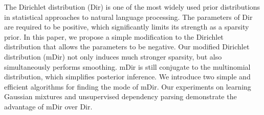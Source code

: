 The Dirichlet distribution (Dir) is one of the most widely used prior distributions in statistical approaches to natural language processing. The parameters of Dir are required to be positive, which significantly limits its strength as a sparsity prior. In this paper, we propose a simple modification to the Dirichlet distribution that allows the parameters to be negative. Our modified Dirichlet distribution (mDir) not only induces much stronger sparsity, but also simultaneously performs smoothing. mDir is still conjugate to the multinomial distribution, which simplifies posterior inference. We introduce two simple and efficient algorithms for finding the mode of mDir. Our experiments on learning Gaussian mixtures and unsupervised dependency parsing demonstrate the advantage of mDir over Dir.
